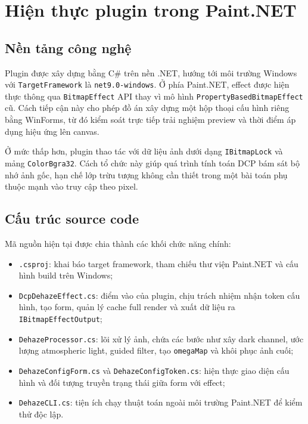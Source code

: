 \newpage
\section{Hiện thực plugin trong Paint.NET}

\subsection{Nền tảng công nghệ}

Plugin được xây dựng bằng C\# trên nền .NET, hướng tới môi trường Windows với \texttt{TargetFramework} là \texttt{net9.0-windows}. Ở phía Paint.NET, effect được hiện thực thông qua \texttt{BitmapEffect} API thay vì mô hình \texttt{PropertyBasedBitmapEffect} cũ. Cách tiếp cận này cho phép đồ án xây dựng một hộp thoại cấu hình riêng bằng WinForms, từ đó kiểm soát trực tiếp trải nghiệm preview và thời điểm áp dụng hiệu ứng lên canvas.

Ở mức thấp hơn, plugin thao tác với dữ liệu ảnh dưới dạng \texttt{IBitmapLock} và mảng \texttt{ColorBgra32}. Cách tổ chức này giúp quá trình tính toán DCP bám sát bộ nhớ ảnh gốc, hạn chế lớp trừu tượng không cần thiết trong một bài toán phụ thuộc mạnh vào truy cập theo pixel.

\subsection{Cấu trúc source code}

Mã nguồn hiện tại được chia thành các khối chức năng chính:
\begin{itemize}
\item \texttt{.csproj}: khai báo target framework, tham chiếu thư viện Paint.NET và cấu hình build trên Windows;
\item \texttt{DcpDehazeEffect.cs}: điểm vào của plugin, chịu trách nhiệm nhận token cấu hình, tạo form, quản lý cache full render và xuất dữ liệu ra \texttt{IBitmapEffectOutput};
\item \texttt{DehazeProcessor.cs}: lõi xử lý ảnh, chứa các bước như xây dark channel, ước lượng atmospheric light, guided filter, tạo \texttt{omegaMap} và khôi phục ảnh cuối;
\item \texttt{DehazeConfigForm.cs} và \texttt{DehazeConfigToken.cs}: hiện thực giao diện cấu hình và đối tượng truyền trạng thái giữa form với effect;
\item \texttt{DehazeCLI.cs}: tiện ích chạy thuật toán ngoài môi trường Paint.NET để kiểm thử độc lập.
\end{itemize}

